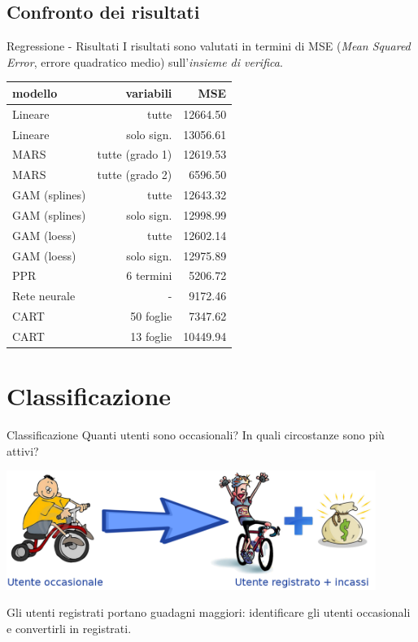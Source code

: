 \documentclass{beamer}
\begin{document}
\subsection{Confronto dei risultati}
\begin{frame}{Regressione - Risultati}
I risultati sono valutati in termini di MSE (\emph{Mean Squared Error},
errore quadratico medio) sull'\emph{insieme di verifica}.

\begin{table}
  \centering
  \begin{tabular}{|| l | r | r ||}
    \hline
    modello       & variabili       & MSE      \\
    \hline \hline
    Lineare       & tutte           & 12664.50 \\
    Lineare       & solo sign.      & 13056.61 \\
    MARS          & tutte (grado 1) & 12619.53 \\
    MARS          & tutte (grado 2) &  6596.50 \\
    GAM (splines) & tutte           & 12643.32 \\
    GAM (splines) & solo sign.      & 12998.99 \\
    GAM (loess)   & tutte           & 12602.14 \\
    GAM (loess)   & solo sign.      & 12975.89 \\
    PPR           & 6 termini       &  5206.72 \\
    Rete neurale  & -               &  9172.46 \\
    CART          & 50  foglie      &  7347.62 \\
    CART          & 13  foglie      & 10449.94 \\
    \hline
  \end{tabular}
\end{table}
\end{frame}



\section{Classificazione}
\begin{frame}{Classificazione}
Quanti utenti sono occasionali? In quali circostanze sono pi\`u attivi?

\begin{center}
  \includegraphics[width=0.9\textwidth]{images/conversion.png}
\end{center}


Gli utenti registrati portano guadagni maggiori: identificare gli utenti
occasionali e convertirli in registrati.
\end{frame}
\end{document}
